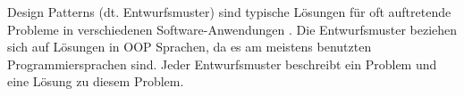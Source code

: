 Design Patterns (dt. Entwurfsmuster) sind typische Lösungen für oft auftretende Probleme in verschiedenen Software-Anwendungen \cite{OOPPaterns}. 
Die Entwurfsmuster beziehen sich auf Lösungen in OOP Sprachen, da es am meistens benutzten Programmiersprachen sind. 
Jeder Entwurfsmuster beschreibt ein Problem und eine Lösung zu diesem Problem.
